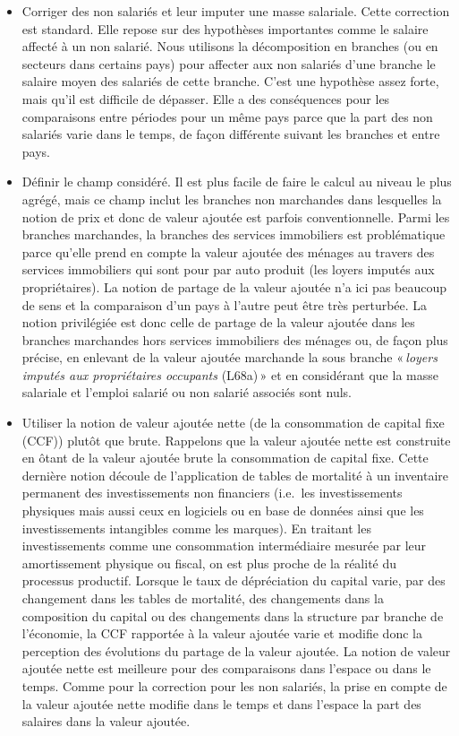 \documentclass[
  french,
  9pt,
  a4paper,
]{article}
\begin{document}
\begin{itemize}
\item
  Corriger des non salariés et leur imputer une masse salariale. Cette
  correction est standard. Elle repose sur des hypothèses importantes
  comme le salaire affecté à un non salarié. Nous utilisons la
  décomposition en branches (ou en secteurs dans certains pays) pour
  affecter aux non salariés d'une branche le salaire moyen des salariés
  de cette branche. C'est une hypothèse assez forte, mais qu'il est
  difficile de dépasser. Elle a des conséquences pour les comparaisons
  entre périodes pour un même pays parce que la part des non salariés
  varie dans le temps, de façon différente suivant les branches et entre
  pays.
\item
  Définir le champ considéré. Il est plus facile de faire le calcul au
  niveau le plus agrégé, mais ce champ inclut les branches non
  marchandes dans lesquelles la notion de prix et donc de valeur ajoutée
  est parfois conventionnelle. Parmi les branches marchandes, la
  branches des services immobiliers est problématique parce qu'elle
  prend en compte la valeur ajoutée des ménages au travers des services
  immobiliers qui sont pour par auto produit (les loyers imputés aux
  propriétaires). La notion de partage de la valeur ajoutée n'a ici pas
  beaucoup de sens et la comparaison d'un pays à l'autre peut être très
  perturbée. La notion privilégiée est donc celle de partage de la
  valeur ajoutée dans les branches marchandes hors services immobiliers
  des ménages ou, de façon plus précise, en enlevant de la valeur
  ajoutée marchande la sous branche «\,\emph{loyers imputés aux
  propriétaires occupants} (L68a)\,» et en considérant que la masse
  salariale et l'emploi salarié ou non salarié associés sont nuls.
\item
  Utiliser la notion de valeur ajoutée nette (de la consommation de
  capital fixe (CCF)) plutôt que brute. Rappelons que la valeur ajoutée
  nette est construite en ôtant de la valeur ajoutée brute la
  consommation de capital fixe. Cette dernière notion découle de
  l'application de tables de mortalité à un inventaire permanent des
  investissements non financiers (i.e.~les investissements physiques
  mais aussi ceux en logiciels ou en base de données ainsi que les
  investissements intangibles comme les marques). En traitant les
  investissements comme une consommation intermédiaire mesurée par leur
  amortissement physique ou fiscal, on est plus proche de la réalité du
  processus productif. Lorsque le taux de dépréciation du capital varie,
  par des changement dans les tables de mortalité, des changements dans
  la composition du capital ou des changements dans la structure par
  branche de l'économie, la CCF rapportée à la valeur ajoutée varie et
  modifie donc la perception des évolutions du partage de la valeur
  ajoutée. La notion de valeur ajoutée nette est meilleure pour des
  comparaisons dans l'espace ou dans le temps. Comme pour la correction
  pour les non salariés, la prise en compte de la valeur ajoutée nette
  modifie dans le temps et dans l'espace la part des salaires dans la
  valeur ajoutée.
\end{itemize}
\end{document}
